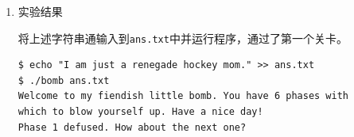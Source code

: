 \documentclass{paper}
\begin{document}
\begin{enumerate}
\begin{enumerate}
                        接着，在函数的第三行中，\verb|push 0x1c(%esp)|将\verb|input|压入栈中，作为\verb|strings_not_equal|函数的另一个参数。

                \item 使用\verb|gdb|调试程序，并查看\verb|0x804a024|地址下字符串的值。
                        
                        首先使用以下命令进入\verb|gdb|交互模式：

                        \verb|gdb ./bomb|

                        接着使用以下命令查看\verb|0x804a024|地址下字符串的值：

                        \begin{lstlisting}
(gdb) x /s 0x804a024
0x804a024:      "I am just a renegade hockey mom."
                        \end{lstlisting}

                        由\verb|gdb|输出的结果可知，"I am just a renegade hockey mom."即是我们需要输入的字符串。

            \end{enumerate}

    \item 实验结果
            
            将上述字符串通输入到\verb|ans.txt|中并运行程序，通过了第一个关卡。

            \begin{lstlisting}
$ echo "I am just a renegade hockey mom." >> ans.txt
$ ./bomb ans.txt
Welcome to my fiendish little bomb. You have 6 phases with
which to blow yourself up. Have a nice day!
Phase 1 defused. How about the next one?
            \end{lstlisting}

\end{enumerate}
\end{document}
